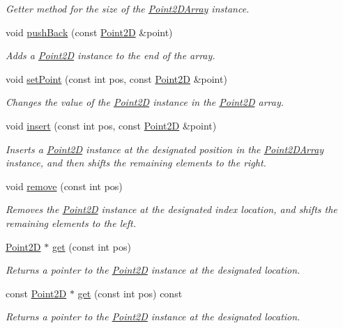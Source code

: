 \begin{DoxyCompactItemize}
\begin{DoxyCompactList}\small\item\em Getter method for the size of the \hyperlink{class_point2_d_array}{Point2\+D\+Array} instance. \end{DoxyCompactList}\item 
void \hyperlink{class_point2_d_array_a2dca1633281df12f1c48244bc0b24bf5}{push\+Back} (const \hyperlink{class_point2_d}{Point2\+D} \&point)
\begin{DoxyCompactList}\small\item\em Adds a \hyperlink{class_point2_d}{Point2\+D} instance to the end of the array. \end{DoxyCompactList}\item 
void \hyperlink{class_point2_d_array_a74c8568c33e69f12703043f31d2a9f89}{set\+Point} (const int pos, const \hyperlink{class_point2_d}{Point2\+D} \&point)
\begin{DoxyCompactList}\small\item\em Changes the value of the \hyperlink{class_point2_d}{Point2\+D} instance in the \hyperlink{class_point2_d}{Point2\+D} array. \end{DoxyCompactList}\item 
void \hyperlink{class_point2_d_array_ad3ec536072dd40ab8965ab4341469179}{insert} (const int pos, const \hyperlink{class_point2_d}{Point2\+D} \&point)
\begin{DoxyCompactList}\small\item\em Inserts a \hyperlink{class_point2_d}{Point2\+D} instance at the designated position in the \hyperlink{class_point2_d_array}{Point2\+D\+Array} instance, and then shifts the remaining elements to the right. \end{DoxyCompactList}\item 
void \hyperlink{class_point2_d_array_a98ee3d20630e07abae84990d452cad8d}{remove} (const int pos)
\begin{DoxyCompactList}\small\item\em Removes the \hyperlink{class_point2_d}{Point2\+D} instance at the designated index location, and shifts the remaining elements to the left. \end{DoxyCompactList}\item 
\hyperlink{class_point2_d}{Point2\+D} $\ast$ \hyperlink{class_point2_d_array_ab8ff000b44a8132bfd326f403de03c74}{get} (const int pos)
\begin{DoxyCompactList}\small\item\em Returns a pointer to the \hyperlink{class_point2_d}{Point2\+D} instance at the designated location. \end{DoxyCompactList}\item 
const \hyperlink{class_point2_d}{Point2\+D} $\ast$ \hyperlink{class_point2_d_array_a0bfe675943db3d25b020aabd27be1b05}{get} (const int pos) const 
\begin{DoxyCompactList}\small\item\em Returns a pointer to the \hyperlink{class_point2_d}{Point2\+D} instance at the designated location. \end{DoxyCompactList}\end{DoxyCompactItemize}



